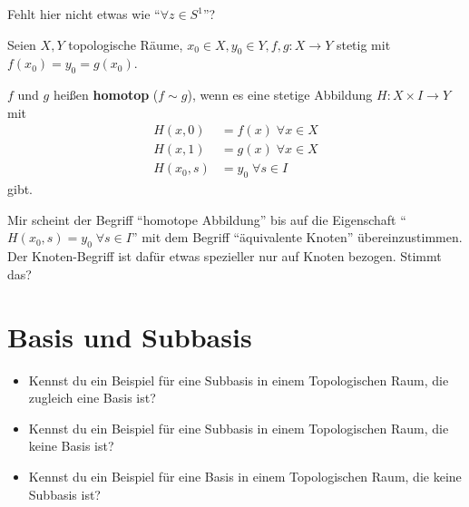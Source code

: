 \documentclass[a5paper,oneside]{scrbook}
\begin{document}
Fehlt hier nicht etwas wie \enquote{$\forall z \in S^1$}?

\begin{definition}%
    Seien $X, Y$ topologische Räume, $x_0 \in X, y_0 \in Y, f, g: X \rightarrow Y$
    stetig mit $f(x_0) = y_0 = g(x_0)$.

    $f$ und $g$ heißen \textbf{homotop} ($f \sim g$), wenn es eine stetige
    Abbildung $H: X \times I \rightarrow Y$ mit 
    \begin{align*}
        H(x,0)    &= f(x) \; \forall x \in X\\
        H(x,1)    &= g(x) \; \forall x \in X\\
        H(x_0, s) &= y_0  \; \forall s \in I
    \end{align*}
    gibt.
\end{definition}

Mir scheint der Begriff \enquote{homotope Abbildung} bis auf die
Eigenschaft \enquote{$H(x_0, s) = y_0  \; \forall s \in I$} mit 
dem Begriff \enquote{äquivalente Knoten} übereinzustimmen.
Der Knoten-Begriff ist dafür etwas spezieller nur auf Knoten bezogen.
Stimmt das?

\section{Basis und Subbasis}
\begin{itemize}
    \item Kennst du ein Beispiel für eine Subbasis in einem Topologischen Raum,
die zugleich eine Basis ist?
    \item Kennst du ein Beispiel für eine Subbasis in einem Topologischen Raum,
die keine Basis ist?
    \item Kennst du ein Beispiel für eine Basis in einem Topologischen Raum,
die keine Subbasis ist?
\end{itemize}
\end{document}
